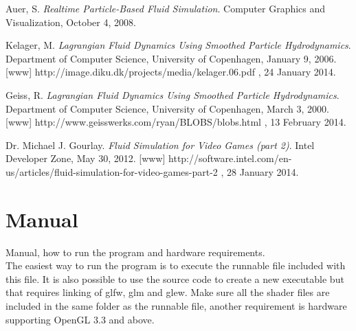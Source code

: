 \documentclass[a4paper,12pt,twoside,final]{report}
\begin{document}
\begin{thebibliography}{11}

  Auer, S.
  \emph{Realtime Particle-Based Fluid Simulation}.
  Computer Graphics and Visualization,
  October 4,
  2008.
  
  Kelager, M.
  \emph{Lagrangian Fluid Dynamics Using Smoothed Particle Hydrodynamics}.
  Department of Computer Science, University of Copenhagen,
  January 9,
  2006.
  [www] http://image.diku.dk/projects/media/kelager.06.pdf , 24 January 2014.
  
  Geiss, R.
  \emph{Lagrangian Fluid Dynamics Using Smoothed Particle Hydrodynamics}.
  Department of Computer Science, University of Copenhagen,
  March 3,
  2000.
  [www] http://www.geisswerks.com/ryan/BLOBS/blobs.html , 13 February 2014.
  
    Dr. Michael J. Gourlay.
  \emph{Fluid Simulation for Video Games (part 2)}.
  Intel Developer Zone,
  May 30,
  2012.
  [www] http://software.intel.com/en-us/articles/fluid-simulation-for-video-games-part-2 , 28 January 2014.
  
\end{thebibliography}

\newpage


\appendix
\chapter{Manual}
Manual, how to run the program and hardware requirements. \\
\noindent The easiest way to run the program is to execute the runnable file included with this file. It is also possible to use the source code to create a new executable but that requires linking of glfw, glm and glew. Make sure all the shader files are included in the same folder as the runnable file, another requirement is hardware supporting OpenGL 3.3 and above.
\end{document}
